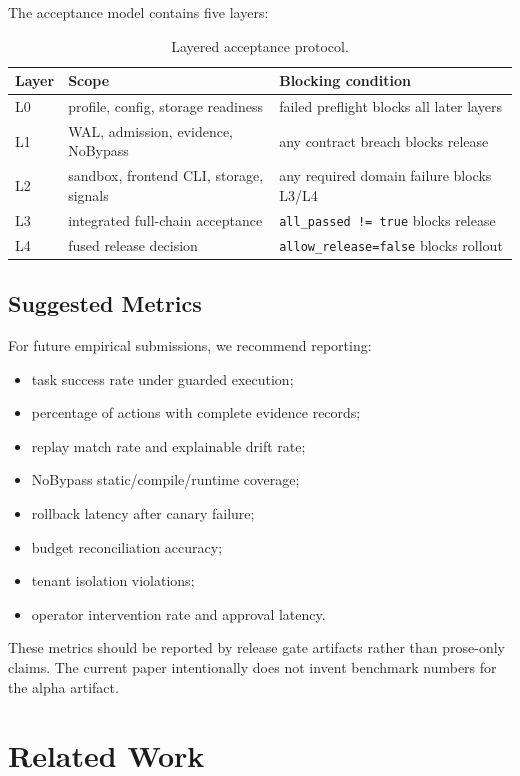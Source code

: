 \documentclass[11pt]{article}
\begin{document}
The acceptance model contains five layers:

\begin{table}[h]
\centering
\begin{tabular}{lll}
\toprule
Layer & Scope & Blocking condition \\
\midrule
L0 & profile, config, storage readiness & failed preflight blocks all later layers \\
L1 & WAL, admission, evidence, NoBypass & any contract breach blocks release \\
L2 & sandbox, frontend CLI, storage, signals & any required domain failure blocks L3/L4 \\
L3 & integrated full-chain acceptance & \texttt{all\_passed != true} blocks release \\
L4 & fused release decision & \texttt{allow\_release=false} blocks rollout \\
\bottomrule
\end{tabular}
\caption{Layered acceptance protocol.}
\label{tab:acceptance}
\end{table}

\subsection{Suggested Metrics}

For future empirical submissions, we recommend reporting:

\begin{itemize}
  \item task success rate under guarded execution;
  \item percentage of actions with complete evidence records;
  \item replay match rate and explainable drift rate;
  \item NoBypass static/compile/runtime coverage;
  \item rollback latency after canary failure;
  \item budget reconciliation accuracy;
  \item tenant isolation violations;
  \item operator intervention rate and approval latency.
\end{itemize}

These metrics should be reported by release gate artifacts rather than prose-only
claims. The current paper intentionally does not invent benchmark numbers for the
alpha artifact.

\section{Related Work}
\end{document}
